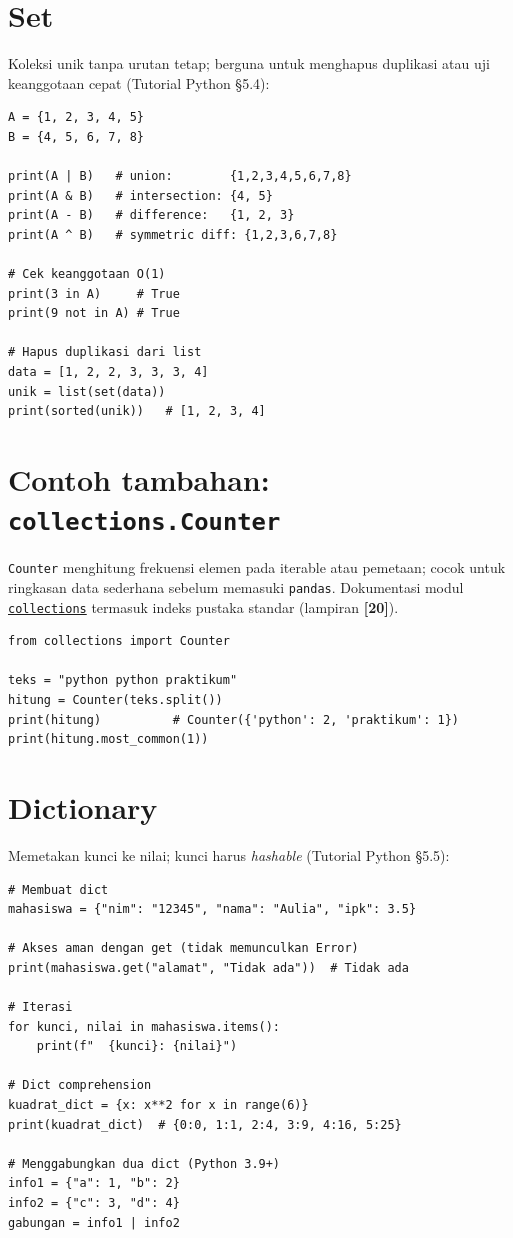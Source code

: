 \documentclass[../main.tex]{subfiles}
\begin{document}
\section{Set}

Koleksi unik tanpa urutan tetap; berguna untuk menghapus duplikasi atau uji keanggotaan cepat (Tutorial Python §5.4):

\begin{lstlisting}[caption=Operasi set]
A = {1, 2, 3, 4, 5}
B = {4, 5, 6, 7, 8}

print(A | B)   # union:        {1,2,3,4,5,6,7,8}
print(A & B)   # intersection: {4, 5}
print(A - B)   # difference:   {1, 2, 3}
print(A ^ B)   # symmetric diff: {1,2,3,6,7,8}

# Cek keanggotaan O(1)
print(3 in A)     # True
print(9 not in A) # True

# Hapus duplikasi dari list
data = [1, 2, 2, 3, 3, 3, 4]
unik = list(set(data))
print(sorted(unik))   # [1, 2, 3, 4]
\end{lstlisting}

\section{Contoh tambahan: \texttt{collections.Counter}}

\noindent \texttt{Counter} menghitung frekuensi elemen pada iterable atau pemetaan; cocok untuk ringkasan data sederhana sebelum memasuki \texttt{pandas}. Dokumentasi modul \href{https://docs.python.org/3/library/collections.html#collections.Counter}{\texttt{collections}} termasuk indeks pustaka standar (lampiran \textbf{[20]}).

\begin{lstlisting}[caption=Counter pada teks token sederhana]
from collections import Counter

teks = "python python praktikum"
hitung = Counter(teks.split())
print(hitung)          # Counter({'python': 2, 'praktikum': 1})
print(hitung.most_common(1))
\end{lstlisting}

\section{Dictionary}

Memetakan kunci ke nilai; kunci harus \textit{hashable} (Tutorial Python §5.5):

\begin{lstlisting}[caption=Dictionary: operasi lanjut]
# Membuat dict
mahasiswa = {"nim": "12345", "nama": "Aulia", "ipk": 3.5}

# Akses aman dengan get (tidak memunculkan Error)
print(mahasiswa.get("alamat", "Tidak ada"))  # Tidak ada

# Iterasi
for kunci, nilai in mahasiswa.items():
    print(f"  {kunci}: {nilai}")

# Dict comprehension
kuadrat_dict = {x: x**2 for x in range(6)}
print(kuadrat_dict)  # {0:0, 1:1, 2:4, 3:9, 4:16, 5:25}

# Menggabungkan dua dict (Python 3.9+)
info1 = {"a": 1, "b": 2}
info2 = {"c": 3, "d": 4}
gabungan = info1 | info2
\end{lstlisting}
\end{document}
